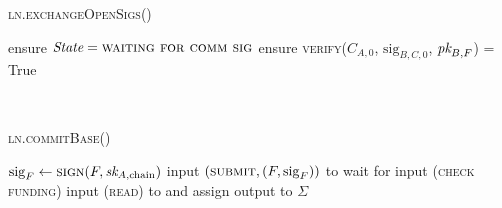 \begin{center}
\begin{processbox}{\textsc{ln.exchangeOpenSigs}()}
\begin{algorithmic}[1]
        \State {}
      \Else \: 
        \State {}
        \State {}
        \label{code:ln:exchange-open-sigs:state-open}
      \EndIf
      \State {}
      \label{code:ln:exchange-open-sigs:b-send}
      \State ensure $\itistate = \textsc{waiting for comm sig}$
      \State ensure \textsc{verify}($C_{A, 0}$, $\mathrm{sig}_{B, C, 0}$,
      $\textit{pk}_{B, F}$) = True
      \label{code:ln:exchange-open-sigs:a-verify}
    \end{algorithmic}
  \end{processbox}
  \label{code:ln:exchange-open-sigs}
\end{center} \ \\

\begin{center}
  \begin{processbox}{\textsc{ln.commitBase}()}
    \begin{algorithmic}[1]
      \State $\mathrm{sig}_F \gets \textsc{sign}(F, \textit{sk}_{A, \mathrm{chain}})$
      \label{code:ln:base:sign-funding}
      \State input $(\textsc{submit}, (F, \mathrm{sig}_F))$ to \ledger{}
      \label{code:ln:commit-base:f-in-state}
        \State wait for input (\textsc{check funding}) 
        \State input (\textsc{read}) to \ledger and assign output to $\Sigma$
      \EndWhile
    \end{algorithmic}
  \end{processbox}
  \label{code:ln:commit-base}
\end{center} \ \\

